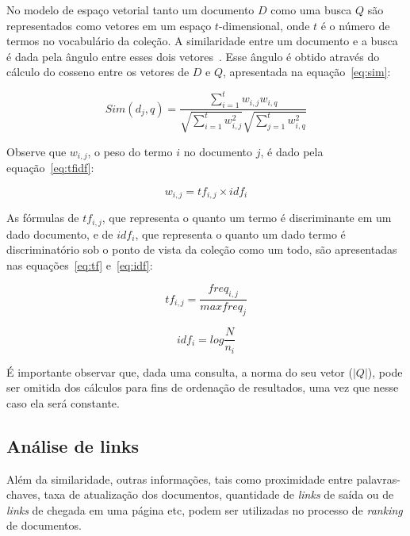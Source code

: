 \documentclass[10pt,twocolumn]{article}
\begin{document}
No modelo de espaço vetorial tanto um documento \(D\) como uma busca
\(Q\) são representados como vetores em um espaço \(t\)-dimensional,
onde \(t\) é o número de termos no vocabulário da coleção. A
similaridade entre um documento e a busca é dada pela ângulo entre esses
dois vetores~\cite{berthier1999modern}.
Esse ângulo é obtido através do cálculo do cosseno entre
os vetores de \(D\) e \(Q\), apresentada na equação~\ref{eq:sim}:

\begin{equation}
Sim(d_{j},q) = \frac{\sum_{i = 1}^{t}w_{i,j} w_{i,q}}{\sqrt{\sum_{i =
1}^{t}w_{i,j}^{2}} \sqrt{\sum_{j = 1}^{t}w_{i,q}^{2}}}
\label{eq:sim}
\end{equation}

Observe que \(w_{i,j}\), o peso do termo \(i\) no documento \(j\), é
dado pela equação~\ref{eq:tfidf}:


\begin{equation}
w_{i,j} = tf_{i,j}\times idf_{i}
\label{eq:tfidf}
\end{equation}

As fórmulas de \(tf_{i,j}\), que representa o quanto um termo é
discriminante em um dado documento, e de \(idf_{i}\), que representa o
quanto um dado termo é discriminatório sob o ponto de vista da coleção
como um todo, são apresentadas nas equações~\ref{eq:tf} e~\ref{eq:idf}:

\begin{equation}
tf_{i,j} = \frac{freq_{i,j}}{max freq_{j}}
\label{eq:tf}
\end{equation}

\begin{equation}
idf_{i} = log\frac{N}{n_{i}}
\label{eq:idf}
\end{equation}

É importante observar que, dada uma consulta, a norma do seu vetor
(\(|Q|\)), pode ser omitida dos cálculos para fins de ordenação de
resultados, uma vez que nesse caso ela será constante.

\subsection{Análise de links}

Além da similaridade, outras informações, tais como
proximidade entre palavras-chaves, taxa de atualização dos documentos,
 quantidade de \emph{links} de saída ou de \emph{links} de chegada em uma página
etc, podem ser utilizadas no processo de \emph{ranking} de documentos.
\end{document}
